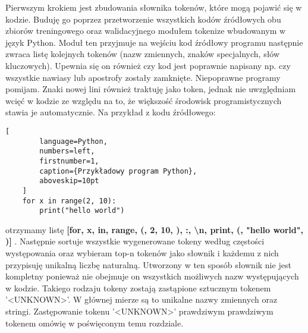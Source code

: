 Pierwszym krokiem jest zbudowania słownika tokenów, które mogą pojawić się w kodzie. Buduję go poprzez przetworzenie wszystkich kodów źródłowych obu zbiorów treningowego oraz 
walidacyjnego modułem tokenize \cite{tokenize} wbudowanym w język Python. Moduł ten przyjmuje na wejściu kod źródłowy programu następnie zwraca listę kolejnych tokenów (nazw zmiennych, 
znaków specjalnych, słów kluczowych). Upewnia się on również czy kod jest poprawnie napisany np. czy wszystkie nawiasy lub apostrofy zostały zamknięte. Niepoprawne programy pomijam. 
Znaki nowej lini również traktuję jako token, jednak nie uwzględniam wcięć w kodzie ze względu na to, że większość środowisk programistycznych stawia je 
automatycznie. Na przykład z kodu źródłowego: 
\begin{addmargin}[10mm]{0mm}
    \begin{lstlisting}[
        language=Python,
        numbers=left,
        firstnumber=1,
        caption={Przykładowy program Python},
        aboveskip=10pt
    ]
    for x in range(2, 10): 
        print("hello world")
    \end{lstlisting}
    \end{addmargin}
otrzymamy listę \textbf{ [for, x, in, range, (, 2, 10, ), :, \textbackslash n, print, (, "hello world", )] }.
Następnie sortuje wszystkie wygenerowane tokeny według częstości występowania oraz wybieram top-n tokenów jako słownik i każdemu z nich przypisuję unikalną liczbę naturalną. 
Utworzony w ten sposób słownik nie jest kompletny ponieważ nie obejmuje on wszystkich możliwych nazw występujących w kodzie. Takiego rodzaju tokeny
zostają zastąpione sztucznym tokenem '<UNKNOWN>'. W głównej mierze są to unikalne nazwy zmiennych oraz stringi. Zastępowanie tokenu '<UNKNOWN>' prawdziwym prawdziwym tokenem omówię w 
poświęconym temu rozdziale. 

